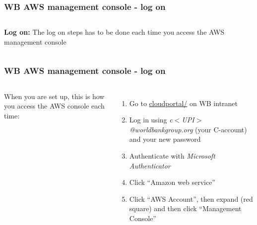 \documentclass[aspectratio=169]{beamer} %
\begin{document}
\begin{frame}
	\frametitle{WB AWS management console - log on}
	\begin{columns}[c]
		
		
		\textbf{Log on:} The log on steps has to be done each time you access the AWS management console
		
	\end{columns}
\end{frame}

\begin{frame}
	\frametitle{WB AWS management console - log on}

	\begin{columns}[c]


		When you are set up, this is how you access the AWS console each time:

		\begin{enumerate}
			\item Go to \url{cloudportal/} on WB intranet
			\item Log in using \textit{c$<$UPI$>$@worldbankgroup.org}
			(your C-account) and your new password
			\item Authenticate with \textit{Microsoft Authenticator}
			\item Click ``Amazon web service''
			\item Click ``AWS Account'', then expand (red square) and then click ``Management Console''

		\end{enumerate}


\end{columns}
\end{frame}
\end{document}
